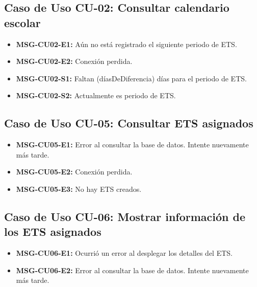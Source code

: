 \subsection{Caso de Uso CU-02: Consultar calendario escolar}
\begin{itemize}
	\item \textbf{\label{msg:CU02-E1}MSG-CU02-E1:} Aún no está registrado el siguiente periodo de ETS.
	\item \textbf{\label{msg:CU02-E2}MSG-CU02-E2:} Conexión perdida.
	\item \textbf{\label{msg:CU02-S1}MSG-CU02-S1:} Faltan (díasDeDiferencia) días para el periodo de ETS.
	\item \textbf{\label{msg:CU02-S2}MSG-CU02-S2:} Actualmente es periodo de ETS.
\end{itemize}

\subsection{Caso de Uso CU-05: Consultar ETS asignados}
\begin{itemize}
	\item \textbf{\label{msg:CU05-E1}MSG-CU05-E1:} Error al consultar la base de datos. Intente nuevamente más tarde.
	\item \textbf{\label{msg:CU05-E2}MSG-CU05-E2:} Conexión perdida.
	\item \textbf{\label{msg:CU05-E3}MSG-CU05-E3:} No hay ETS creados.
\end{itemize}

\subsection{Caso de Uso CU-06: Mostrar información de los ETS asignados}
\begin{itemize}
	\item \textbf{\label{msg:CU06-E1}MSG-CU06-E1:} Ocurrió un error al desplegar los detalles del ETS.
	\item \textbf{\label{msg:CU06-E2}MSG-CU06-E2:} Error al consultar la base de datos. Intente nuevamente más tarde.
\end{itemize}

